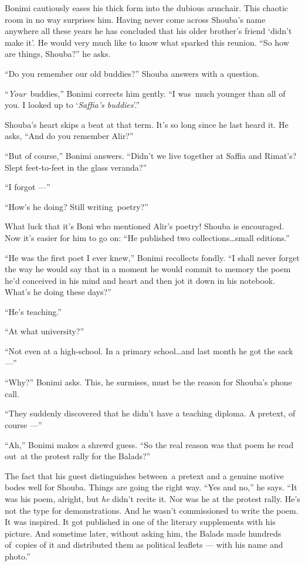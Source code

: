 \documentclass[twoside,11pt]{book}
\begin{document}
Bonimi cautiously eases his thick form into the dubious armchair. This chaotic room in no way surprises him. Having
never come across Shouba's name anywhere all these years he has concluded that his older brother's friend `didn't
make it{}'. He would very much like to know what sparked this reunion. ``So how are things,
Shouba?'' he asks.

``Do you remember our old buddies?'' Shouba answers with a question.

``\textit{Your}~buddies,'' Bonimi corrects him gently. ``I was~much younger than all of you. I looked up to
`\textit{Saffia's buddies}'.''

Shouba's heart skips a beat at that term. It's so long since he last heard it. He asks, ``And do you
remember Alir?''

``But of course,'' Bonimi answers. ``Didn't we live together at Saffia and
Rimat's? Slept feet-to-feet in the glass veranda?''

``I forgot ---''

``How's he doing? Still writing~poetry?''

What luck that it's Boni who mentioned Alir's poetry! Shouba is encouraged. Now it's easier for him to go on:
``He published two collections{\ldots}small{ }editions.''

``He was the first poet I ever knew,'' Bonimi recollects fondly. ``I shall never
forget the way he would say that in a moment he would commit to memory the poem he'd conceived in his mind and heart
and then jot it down in his notebook. What's he doing these days?''

``He's teaching.''

``At what university?''

``Not even {at} a high-school.{  }{In a} primary
school{\ldots}and last month he got the sack ---''

``Why?'' Bonimi asks. This, he surmises, must be the reason for Shouba's phone call.

``They suddenly discovered that he didn't have a teaching diploma. A pretext, of course ---''

``Ah,'' Bonimi makes a shrewd guess. ``So the real reason was that poem he read
out~at the protest rally for the Balads?''

The fact that his guest distinguishes between~a pretext and a genuine motive bodes well for Shouba. Things are going the
right way. ``Yes and no,'' he says. ``It was his poem, alright, but \textit{he}
didn't recite it. Nor was he at the protest rally. He's not the type for demonstrations. And he wasn't commissioned to
write the poem. It was inspired. It got published in one of the literary supplements with his picture. And sometime
later, without asking him, the Balads made hundreds of~copies of it and distributed them as political leaflets ---
with his name and photo.''
\end{document}
